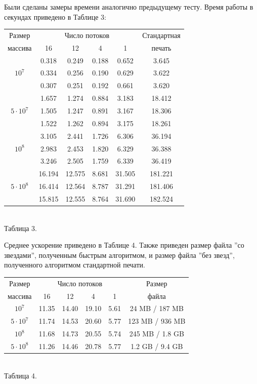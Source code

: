 Были сделаны замеры времени аналогично предыдущему тесту.
Время работы в секундах приведено в Таблице 3:
\begin{center}
\begin{tabular}{||c|c|c|c|c|c||}
\hline
\hline
Размер & \multicolumn{4}{c|}{Число потоков} & Стандартная\\
\hhline{~|-|-|-|-|~|}
массива & 16 & 12 & 4 & 1 & печать \\
\hline
\hline
& 0.318 & 0.249 & 0.188 & 0.652 & 3.645 \\
\hhline{~|-|-|-|-|-|}
$10^7$ & 0.334 & 0.256 & 0.190 & 0.629 & 3.622 \\
\hhline{~|-|-|-|-|-|}
& 0.307 & 0.251 & 0.192 & 0.661 & 3.620 \\
\hline
& 1.657 & 1.274 & 0.884 & 3.183 & 18.412 \\
\hhline{~|-|-|-|-|-|}
$5 \cdot 10^7$ & 1.505 & 1.247 & 0.891 & 3.167 & 18.306 \\
\hhline{~|-|-|-|-|-|}
& 1.522 & 1.262 & 0.894 & 3.175 & 18.261 \\
\hline
& 3.105 & 2.441 & 1.726 & 6.306 & 36.194 \\
\hhline{~|-|-|-|-|-|}
$10^8$ & 2.983 & 2.453 & 1.820 & 6.329 & 36.388 \\
\hhline{~|-|-|-|-|-|}
& 3.246 & 2.505 & 1.759 & 6.339 &  36.419 \\
\hline
& 16.194 & 12.575 & 8.681 & 31.505 & 181.221 \\
\hhline{~|-|-|-|-|-|}
$5 \cdot 10^8$ & 16.414 & 12.564 & 8.787 & 31.291 & 181.406 \\
\hhline{~|-|-|-|-|-|}
& 15.815 & 12.555  & 8.764 & 31.690 & 182.524 \\
\hline
\hline
\end{tabular}
\\\vspace{10pt}
\small{Таблица 3.}
\end{center}
Среднее ускорение приведено в Таблице 4.
Также приведен размер файла ''со звездами'', полученным быстрым алгоритмом, и размер файла ''без звезд'', полученного алгоритмом стандартной печати.

\begin{center}
\begin{tabular}{||c|c|c|c|c|c||}
\hline
\hline
Размер & \multicolumn{4}{c|}{Число потоков} & Размер\\
\hhline{~|-|-|-|-|~|}
массива & 16 & 12 & 4 & 1 & файла \\
\hline
$10^7$  & 11.35 & 14.40 & 19.10 & 5.61 & 24 MB / 187 MB \\
\hline
$5 \cdot 10^7$ &11.74 & 14.53 & 20.60 & 5.77 & 123 MB / 936 MB\\
\hline
$10^8$ &11.68 & 14.73 & 20.55 & 5.74 & 245 MB / 1.8 GB \\
\hline
$5 \cdot 10^8$ &11.26 & 14.46 & 20.78 & 5.77 & 1.2 GB / 9.4 GB\\
\hline
\hline
\end{tabular}
\\\vspace{10pt}
\small{Таблица 4.}
\end{center}

